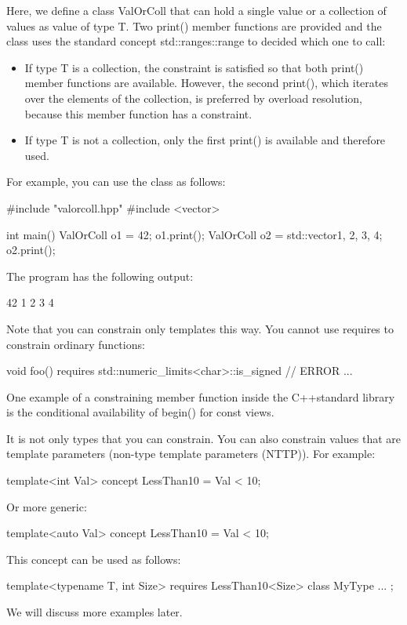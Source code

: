 Here, we define a class ValOrColl that can hold a single value or a collection of values as value of type T. Two print() member functions are provided and the class uses the standard concept std::ranges::range to decided which one to call:

\begin{itemize}
\item
If type T is a collection, the constraint is satisfied so that both print() member functions are available. However, the second print(), which iterates over the elements of the collection, is preferred by overload resolution, because this member function has a constraint.

\item
If type T is not a collection, only the first print() is available and therefore used.
\end{itemize}

For example, you can use the class as follows:


\begin{cpp}
#include "valorcoll.hpp"
#include <vector>

int main()
{
	ValOrColl o1 = 42;
	o1.print();
	ValOrColl o2 = std::vector{1, 2, 3, 4};
	o2.print();
}
\end{cpp}

The program has the following output:

\begin{shell}
42
1 2 3 4
\end{shell}

Note that you can constrain only templates this way. You cannot use requires to constrain ordinary functions:

\begin{cpp}
void foo() requires std::numeric_limits<char>::is_signed // ERROR
{
	...
}
\end{cpp}

One example of a constraining member function inside the C++standard library is the conditional availability of begin() for const views.


It is not only types that you can constrain. You can also constrain values that are template parameters (non-type template parameters (NTTP)). For example:

\begin{cpp}
template<int Val>
concept LessThan10 = Val < 10;
\end{cpp}

Or more generic:

\begin{cpp}
template<auto Val>
concept LessThan10 = Val < 10;
\end{cpp}

This concept can be used as follows:

\begin{cpp}
template<typename T, int Size>
requires LessThan10<Size>
class MyType {
	...
};
\end{cpp}

We will discuss more examples later.











